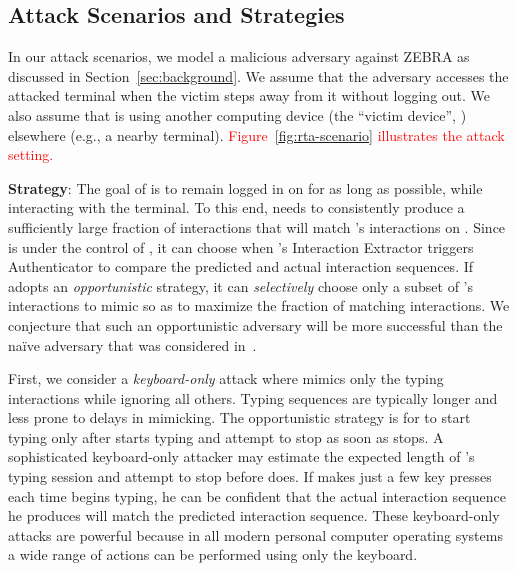 \documentclass[conference]{IEEEtran}
\newcommand{\zebra}{ZEBRA\xspace}
\newcommand{\KBactivity}{keyboard-only\xspace}
\newcommand{\attacker}{\xspace}
\newcommand{\victim}{\xspace}
\newcommand{\attackedterminal}{\xspace}
\newcommand{\victimdevice}{\xspace}
\newcommand\changeAsokan[1]{\textcolor{red}{#1}}
\newcommand\changeAsokan[1]{{#1}}
\begin{document}
 
\subsection{Attack Scenarios and Strategies}
\label{subsec:scenarios}






In our attack scenarios, we model a malicious adversary against \zebra
as discussed in Section~\ref{sec:background}.  We assume that the
adversary \attacker accesses the attacked terminal \attackedterminal when the victim \victim steps away from
it without logging out. We also assume that \victim is using
another computing device (the ``victim device'', \victimdevice) elsewhere (e.g., a nearby terminal). \changeAsokan{Figure~\ref{fig:rta-scenario} illustrates the attack setting.}


\vspace{1mm}
\noindent\textbf{Strategy}: The goal of \attacker is to remain logged in on \attackedterminal for as long as possible, while interacting with the terminal. To this end, \attacker needs to consistently produce a sufficiently large fraction of interactions that will match \victim's interactions on \victimdevice. Since \attackedterminal is under the control of \attacker, it can choose when \attackedterminal's Interaction Extractor triggers Authenticator to compare the predicted and actual interaction sequences. If \attacker adopts an \textit{opportunistic} strategy, it can \textit{selectively} choose only a subset of \victim's interactions to mimic so as to maximize the fraction of matching interactions.
We conjecture that such an opportunistic adversary will be more
successful than the na\"{i}ve adversary that was considered
in~\cite{mare2014zebra}.

First, we consider a
\textit{\KBactivity} attack where \attacker mimics only the typing
interactions while ignoring all others. Typing sequences are typically longer and less prone to delays in mimicking.
The opportunistic strategy is for \attacker to start typing only after \victim starts
typing and attempt to stop as soon as 
\victim stops. A sophisticated \KBactivity attacker may estimate
the expected length of \victim's typing session and
attempt to stop before \victim does. If \attacker makes just a few key presses each time \victim begins typing, he can be confident that the actual interaction sequence he produces will match the predicted interaction sequence. These \KBactivity attacks are powerful because in all modern personal computer operating systems a wide range of actions can be performed using only the keyboard.
\end{document}
